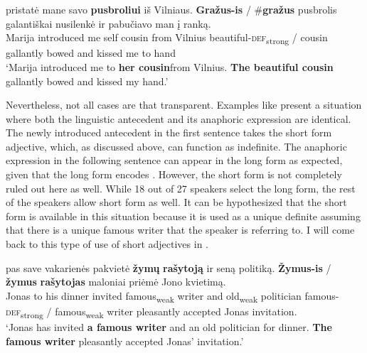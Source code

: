 \documentclass[output=paper,
modfonts
]{langscibook}
\begin{document}
\begin{exe}
	\ex \label{ex:sereikaite:37}
	 {pristatė} {mane} {savo} {\textbf{pusbroliui}} {iš} {Vilniaus}. \textbf{Gražus-is} \textnormal{/} \textnormal{\#}\textbf{gražus} {pusbrolis} {galantiškai} {nusilenkė} {ir} {pabučiavo} {man} {į} {ranką}.\\
	Marija introduced me self {cousin} from Vilnius {beautiful-\textsc{def}\textsubscript{strong}} /  cousin gallantly bowed and kissed me to hand \\
	\trans `Marija introduced me to \textbf{her cousin}\largerpage[2] from Vilnius. \textbf{The beautiful cousin} gallantly bowed and kissed my hand.'
\end{exe}

Nevertheless, not all cases are that transparent. Examples like  present a situation where both the linguistic antecedent and its anaphoric expression are identical. The newly introduced antecedent in the first sentence  takes the short form adjective, which, as discussed above, can function as indefinite. The anaphoric expression in the following sentence  can appear in the long form as expected, given that the long form encodes . However, the short form is not completely ruled out here as well. While 18 out of 27 speakers select the long form, the rest of the speakers allow short form as well. It can be hypothesized that the short form is available in this situation because it is used as a unique definite assuming that there is a unique famous writer that the speaker is referring to. I will come back to this type of use of short adjectives in .

\begin{exe}
	\ex \label{ex:sereikaite:38}
	 {pas} {save} {vakarienės} {pakvietė} \textbf{žymų} \textbf{rašytoją} {ir} {seną} {politiką}. \textbf{Žymus-is} \textnormal{/} \textbf{žymus} {\textbf{rašytojas}} {maloniai} {priėmė} {Jono} {kvietimą}. \\
	Jonas to his dinner invited {famous\textsubscript{weak}} {writer} and old\textsubscript{weak} politician {famous-\textsc{def}\textsubscript{strong}} / {famous\textsubscript{weak}} {writer} pleasantly accepted Jonas invitation.\\
	\trans `Jonas has invited \textbf{a famous writer} and an old politician for dinner. \textbf{The famous writer} pleasantly accepted Jonas' invitation.' 
\end{exe}
\end{document}
